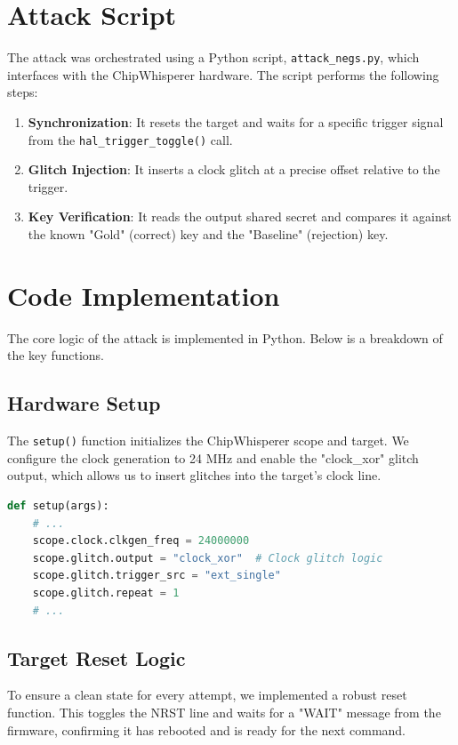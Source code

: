 \section{Attack Script}
The attack was orchestrated using a Python script, \texttt{attack\_negs.py}, which interfaces with the ChipWhisperer hardware. The script performs the following steps:
\begin{enumerate}
    \item \textbf{Synchronization}: It resets the target and waits for a specific trigger signal from the \texttt{hal\_trigger\_toggle()} call.
    \item \textbf{Glitch Injection}: It inserts a clock glitch at a precise offset relative to the trigger.
    \item \textbf{Key Verification}: It reads the output shared secret and compares it against the known "Gold" (correct) key and the "Baseline" (rejection) key.
\end{enumerate}

\section{Code Implementation}
The core logic of the attack is implemented in Python. Below is a breakdown of the key functions.

\subsection{Hardware Setup}
The \texttt{setup()} function initializes the ChipWhisperer scope and target. We configure the clock generation to 24 MHz and enable the "clock\_xor" glitch output, which allows us to insert glitches into the target's clock line.

\begin{lstlisting}[language=Python]
def setup(args):
    # ...
    scope.clock.clkgen_freq = 24000000
    scope.glitch.output = "clock_xor"  # Clock glitch logic
    scope.glitch.trigger_src = "ext_single"
    scope.glitch.repeat = 1
    # ...
\end{lstlisting}

\subsection{Target Reset Logic}
To ensure a clean state for every attempt, we implemented a robust reset function. This toggles the NRST line and waits for a "WAIT" message from the firmware, confirming it has rebooted and is ready for the next command.

